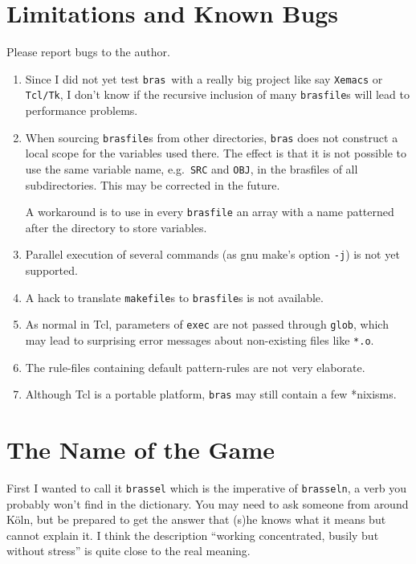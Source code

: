 \documentclass[11pt,bibtotoc,idxtotoc]{scrreprt}
\newcommand{\bras}{\texttt{bras}}
\begin{document}
\section{Limitations and Known Bugs}
Please report bugs to the author.
\begin{enumerate}
\item Since I did not yet test \bras\ with a really big project like
  say \texttt{Xemacs} or \texttt{Tcl/Tk}, I don't know if the
  recursive inclusion of many \texttt{brasfile}s will lead to
  performance problems.

\item When sourcing \texttt{brasfile}s from other directories, \bras{}
  does not construct a local scope for the variables used there. The
  effect is that it is not possible to use the same variable name,
  e.g.\ \texttt{SRC} and \texttt{OBJ}, in the brasfiles of all
  subdirectories. This may be corrected in the future.
  
  A workaround is to use in every \texttt{brasfile} an array with a
  name patterned after the directory to store variables.
  
\item Parallel execution of several commands (as gnu make's option
  \texttt{-j}) is not yet supported.
  
\item A hack to translate \texttt{makefile}s to \texttt{brasfile}s is
  not available.
  
\item As normal in Tcl, parameters of \texttt{exec} are not passed
  through \texttt{glob}, which may lead to surprising error messages
  about non-existing files like \texttt{*.o}.
  
\item The rule-files containing default pattern-rules are not very
  elaborate.
  
\item Although Tcl is a portable platform, \bras{} may still contain a
  few *nixisms.
\end{enumerate}

\section{The Name of the Game}

First I wanted to call it \texttt{brassel} which is the imperative of
\texttt{brasseln}, a verb you probably won't find in the
dictionary. You may need to ask someone from around K\"oln, but be
prepared to get the answer that (s)he knows what it means but cannot
explain it. I think the description "`working concentrated, busily but
without stress"' is quite close to the real meaning.
\end{document}
